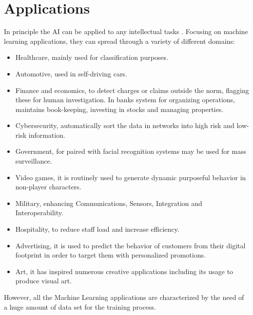 \section{Applications}
In principle the AI can be applied to any intellectual tasks \cite{book:1}. Focusing on machine learning applications, they can spread through a variety of different domains:
\begin{itemize}
\item Healthcare, mainly used for classification purposes.
\item Automotive, used in self-driving cars.
\item Finance and economics, to detect charges or claims outside the norm, flagging these for human investigation. In banks system for organizing operations, maintains book-keeping, investing in stocks and managing properties.
\item Cybersecurity, automatically sort the data in networks into high risk and low-risk information.
\item Government, for paired with facial recognition systems may be used for mass surveillance.
\item Video games, it is routinely used to generate dynamic purposeful behavior in non-player characters.
\item Military, enhancing Communications, Sensors, Integration and Interoperability.
\item Hospitality, to reduce staff load and increase efficiency.
\item Advertising, it is used to predict the behavior of customers from their digital footprint in order to target them with personalized promotions.
\item Art, it has inspired numerous creative applications including its usage to produce visual art.
\end{itemize}
However, all the Machine Learning applications are characterized by the need of a huge amount of data set for the training process.